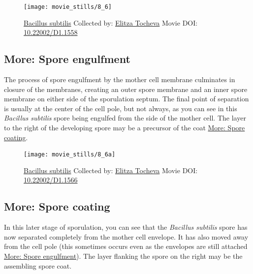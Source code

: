 \documentclass[]{tufte-book}
\begin{document}
\begin{figure}
\texttt{[image: movie\_stills/8\_6]} \caption[\protect\hyperlink{tree}{Bacillus subtilis} Collected by:
\protect\hyperlink{elitza_tocheva}{Elitza Tocheva} Movie DOI:
\href{https://doi.org/10.22002/D1.1558}{10.22002/D1.1558}]{\protect\hyperlink{tree}{Bacillus subtilis} Collected by:
\protect\hyperlink{elitza_tocheva}{Elitza Tocheva} Movie DOI:
\href{https://doi.org/10.22002/D1.1558}{10.22002/D1.1558}}\label{fig:8-6}
\end{figure}

\hypertarget{Spore_engulfment}{\subsection*{More: Spore
engulfment}\label{Spore_engulfment}}

The process of spore engulfment by the mother cell membrane culminates
in closure of the membranes, creating an outer spore membrane and an
inner spore membrane on either side of the sporulation septum. The final
point of separation is usually at the center of the cell pole, but not
always, as you can see in this \emph{Bacillus subtilis} spore being
engulfed from the side of the mother cell. The layer to the right of the
developing spore may be a precursor of the coat
\protect\hyperlink{Spore_coating}{More: Spore coating}.





\begin{figure}
\texttt{[image: movie\_stills/8\_6a]} \caption[\protect\hyperlink{tree}{Bacillus subtilis} Collected by:
\protect\hyperlink{elitza_tocheva}{Elitza Tocheva} Movie DOI:
\href{https://doi.org/10.22002/D1.1566}{10.22002/D1.1566}]{\protect\hyperlink{tree}{Bacillus subtilis} Collected by:
\protect\hyperlink{elitza_tocheva}{Elitza Tocheva} Movie DOI:
\href{https://doi.org/10.22002/D1.1566}{10.22002/D1.1566}}\label{fig:8-6a}
\end{figure}

\hypertarget{Spore_coating}{\subsection*{More: Spore
coating}\label{Spore_coating}}

In this later stage of sporulation, you can see that the \emph{Bacillus
subtilis} spore has now separated completely from the mother cell
envelope. It has also moved away from the cell pole (this sometimes
occurs even as the envelopes are still attached
\protect\hyperlink{Spore_engulfment}{More: Spore engulfment}). The layer
flanking the spore on the right may be the assembling spore coat.
\end{document}
